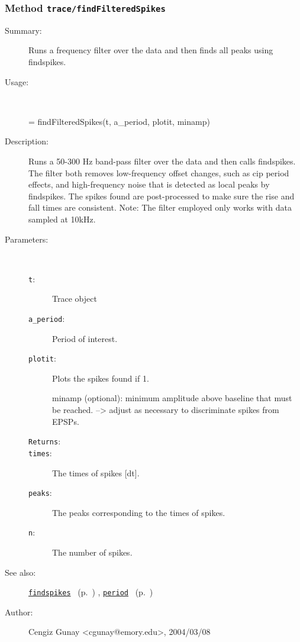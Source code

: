 \subsubsection[Method \texttt{findFilteredSpikes}]{Method \texttt{trace/findFilteredSpikes}}%
%
\label{ref_trace__findFilteredSpikes}%
\hypertarget{ref_trace__findFilteredSpikes}{}%
\begin{description}
\item[Summary:]Runs a frequency filter over the data and then 
			finds all peaks using findspikes.
%
\item[Usage:]~%
\begin{lyxcode}%
[times, peaks, n] = 
	findFilteredSpikes(t, a\_period, plotit, minamp)
%
\end{lyxcode}%
%
\item[Description:]%
Runs a 50-300 Hz band-pass filter over the data and then calls findspikes.
   The filter both removes low-frequency offset changes, such as 
   cip period effects, and high-frequency noise that is detected 
   as local peaks by findspikes. The spikes found are 
   post-processed to make sure the rise and fall times are consistent.
   Note: The filter employed only works with data sampled at 10kHz.
\item[Parameters:]~
\begin{description}%
\item[\texttt{t}:]
 Trace object
\item[\texttt{a\_period}:]
 Period of interest.
\item[\texttt{plotit}:]
 Plots the spikes found if 1.

minamp (optional): minimum amplitude above baseline that must be reached.
--> adjust as necessary to discriminate spikes from EPSPs.\item[\texttt{Returns}:]

\item[\texttt{times}:]
 The times of spikes [dt].
\item[\texttt{peaks}:]
 The peaks corresponding to the times of spikes.
\item[\texttt{n}:]
 The number of spikes.
\end{description}%
%
%
%
\item[See also:]%
\hyperlink{ref_findspikes}{\texttt{findspikes}}%
\ (p.~\pageref{ref_findspikes})%
%
, \hyperlink{ref_period}{\texttt{period}}%
\ (p.~\pageref{ref_period})%
%
%
\item[Author:]%
Cengiz Gunay <cgunay@emory.edu>, 2004/03/08%
\end{description}
\methodline%
